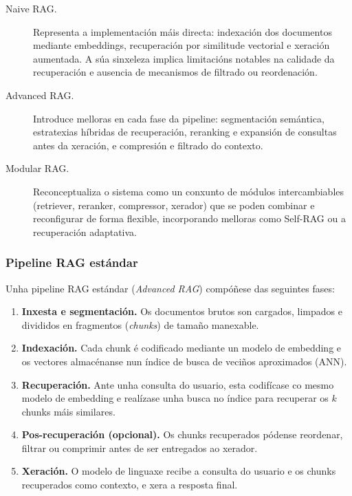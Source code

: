 \documentclass[11pt, a4paper, oneside]{report}
\begin{document}
\begin{description}
  \item[Naive RAG.] Representa a implementación máis directa: indexación dos documentos
    mediante embeddings, recuperación por similitude vectorial e xeración aumentada. A
    súa sinxeleza implica limitacións notables na calidade da recuperación e ausencia
    de mecanismos de filtrado ou reordenación.

  \item[Advanced RAG.] Introduce melloras en cada fase da pipeline: segmentación
    semántica, estratexias híbridas de recuperación, reranking e expansión de consultas
    antes da xeración, e compresión e filtrado do contexto.

  \item[Modular RAG.] Reconceptualiza o sistema como un conxunto de módulos
    intercambiables (retriever, reranker, compressor, xerador) que se poden combinar e
    reconfigurar de forma flexible, incorporando melloras como Self-RAG
    \citep{asai2024self} ou a recuperación adaptativa.
\end{description}

\subsubsection{Pipeline RAG estándar}
\label{sec:pipeline}

Unha pipeline RAG estándar (\textit{Advanced RAG}) compóñese das seguintes fases:

\begin{enumerate}
  \item \textbf{Inxesta e segmentación.} Os documentos brutos son cargados, limpados
    e divididos en fragmentos (\textit{chunks}) de tamaño manexable.
  \item \textbf{Indexación.} Cada chunk é codificado mediante un modelo de embedding
    e os vectores almacénanse nun índice de busca de veciños aproximados (\ac{ANN}).
  \item \textbf{Recuperación.} Ante unha consulta do usuario, esta codifícase co mesmo
    modelo de embedding e realízase unha busca no índice para recuperar os $k$ chunks
    máis similares.
  \item \textbf{Pos-recuperación (opcional).} Os chunks recuperados pódense reordenar,
    filtrar ou comprimir antes de ser entregados ao xerador.
  \item \textbf{Xeración.} O modelo de linguaxe recibe a consulta do usuario e os
    chunks recuperados como contexto, e xera a resposta final.
\end{enumerate}
\end{document}
